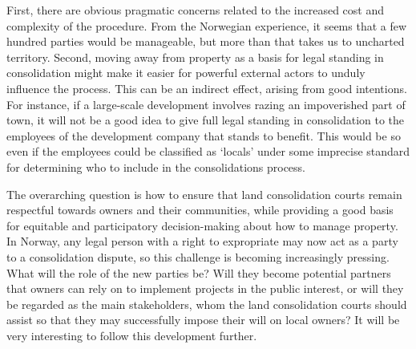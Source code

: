 First, there are obvious pragmatic concerns related to the increased cost and complexity of the procedure. From the Norwegian experience, it seems that a few hundred parties would be manageable, but more than that takes us to uncharted territory. Second, moving away from property as a basis for legal standing in consolidation might make it easier for powerful external actors to unduly influence the process. This can be an indirect effect, arising from good intentions. For instance, if a large-scale development involves razing an impoverished part of town, it will not be a good idea to give full legal standing in consolidation to the employees of the development company that stands to benefit. This would be so even if the employees could be classified as `locals' under some imprecise standard for determining who to include in the consolidations process.


The overarching question is how to ensure that land consolidation courts remain respectful towards owners and their communities, while providing a good basis for equitable and participatory decision-making about how to manage property. In Norway, any legal person with a right to expropriate may now act as a party to a consolidation dispute, so this challenge is becoming increasingly pressing. What will the role of the new parties be? Will they become potential partners that owners can rely on to implement projects in the public interest, or will they be regarded as the main stakeholders, whom the land consolidation courts should assist so that they may successfully impose their will on local owners? It will be very interesting to follow this development further.


